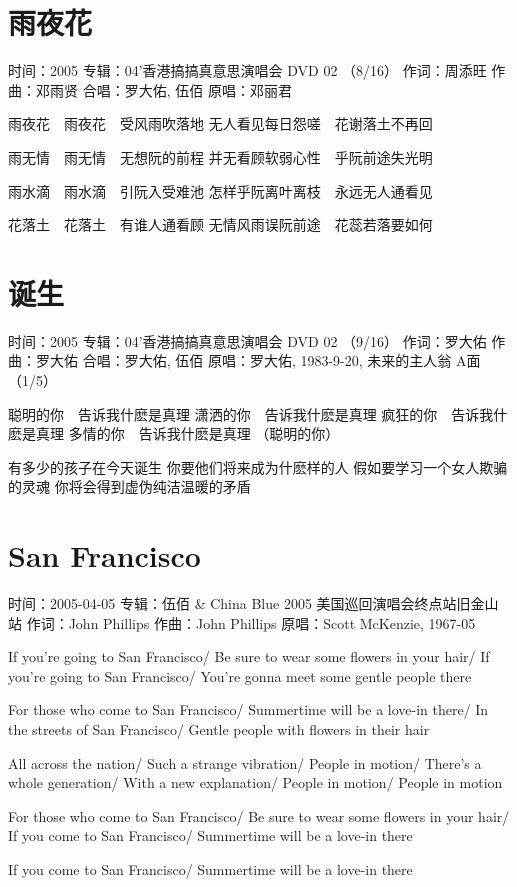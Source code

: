 \documentclass[UTF8,a4paper,oneside,twocolumn,12pt]{ctexbook}
\newcommand{\infopair}[2]{\textbullet #1：#2}
\newcommand{\zc}[1][伍佰]{\infopair{作词}{#1}}
\newcommand{\zq}[1][伍佰]{\infopair{作曲}{#1}}
\newcommand{\zj}[1]{\infopair{专辑}{#1}}
\newcommand{\yc}[1]{\infopair{原唱}{#1}}
\newcommand{\sj}[1]{\infopair{时间}{#1}}
\newenvironment{info}{\begin{flushleft}\kaishu
	}
	{\end{flushleft}\normalsize\yahei\par}
\newenvironment{lyric}{
	}
{}
\begin{document}
\section{雨夜花}
\begin{info}
	\sj{2005}
	\zj{04'香港搞搞真意思演唱会 DVD 02 （8/16）}
	\zc[周添旺]
	\zq[邓雨贤]
	\infopair{合唱}{罗大佑, 伍佰}
	\yc{邓丽君}
\end{info}
\begin{lyric}
	雨夜花　雨夜花　受风雨吹落地
	无人看见每日怨嗟　花谢落土不再回

	雨无情　雨无情　无想阮的前程
	并无看顾软弱心性　乎阮前途失光明

	雨水滴　雨水滴　引阮入受难池
	怎样乎阮离叶离枝　永远无人通看见

	花落土　花落土　有谁人通看顾
	无情风雨误阮前途　花蕊若落要如何
\end{lyric}

\section{诞生}
\begin{info}
	\sj{2005}
	\zj{04'香港搞搞真意思演唱会 DVD 02 （9/16）}
	\zc[罗大佑]
	\zq[罗大佑]
	\infopair{合唱}{罗大佑, 伍佰}
	\yc{罗大佑, 1983-9-20, 未来的主人翁 A面（1/5）}
\end{info}
\begin{lyric}
	聪明的你　告诉我什麽是真理
	潇洒的你　告诉我什麽是真理
	疯狂的你　告诉我什麽是真理
	多情的你　告诉我什麽是真理
	（聪明的你）

	有多少的孩子在今天诞生
	你要他们将来成为什麽样的人
	假如要学习一个女人欺骗的灵魂
	你将会得到虚伪纯洁温暖的矛盾
\end{lyric}

\section{San Francisco}%
\begin{info}
	\sj{2005-04-05}%
	\zj{伍佰 \& China Blue 2005 美国巡回演唱会终点站旧金山站}
	\zc[John Phillips]
	\zq[John Phillips]
	\yc{Scott McKenzie, 1967-05}
\end{info}
\begin{lyric}
	If you're going to San Francisco/
	Be sure to wear some flowers in your hair/
	If you're going to San Francisco/
	You're gonna meet some gentle people there

	For those who come to San Francisco/
	Summertime will be a love-in there/
	In the streets of San Francisco/
	Gentle people with flowers in their hair

	All across the nation/
	Such a strange vibration/
	People in motion/
	There's a whole generation/
	With a new explanation/
	People in motion/
	People in motion

	For those who come to San Francisco/
	Be sure to wear some flowers in your hair/
	If you come to San Francisco/
	Summertime will be a love-in there

	If you come to San Francisco/
	Summertime will be a love-in there
\end{lyric}
\end{document}
